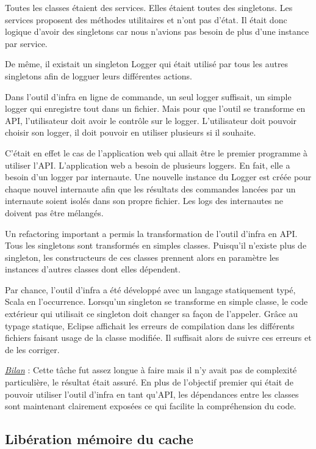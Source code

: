 Toutes les classes étaient des services. Elles étaient toutes des singletons.
Les services proposent des méthodes utilitaires et n'ont pas d'état. Il était
donc logique d'avoir des singletons car nous n'avions pas besoin de plus d'une
instance par service. 

De même, il existait un singleton Logger qui était utilisé par tous les autres
singletons afin de logguer leurs différentes actions.

Dans l'outil d'infra en ligne de commande, un seul logger suffisait, un simple
logger qui enregistre tout dans un fichier.
Mais pour que l'outil se transforme en API, l'utilisateur doit avoir le
contrôle sur le logger. L'utilisateur doit pouvoir choisir son logger, il doit
pouvoir en utiliser plusieurs si il souhaite.

C'était en effet le cas de l'application web qui allait être le premier
programme à utiliser l'API. L'application web a besoin de plusieurs
loggers. En fait, elle a besoin d'un logger par internaute.
Une nouvelle instance du Logger est créée pour chaque nouvel internaute afin
que les résultats des commandes lancées par un internaute soient isolés dans son
propre fichier. Les logs des internautes ne doivent pas être mélangés.

Un refactoring important a permis la transformation de l'outil d'infra en API.
Tous les singletons sont transformés en simples classes.
Puisqu'il n'existe plus de singleton, les constructeurs de ces classes prennent
alors en paramètre les instances d'autres classes dont elles dépendent.

Par chance, l'outil d'infra a été développé avec un langage statiquement
typé, Scala en l’occurrence.
Lorsqu'un singleton se transforme en simple classe, le code extérieur qui
utilisait ce singleton doit changer sa façon de l'appeler.
Grâce au typage statique, Eclipse affichait les erreurs de compilation dans
les différents fichiers faisant usage de la classe modifiée. Il suffisait alors
de suivre ces erreurs et de les corriger.

\underline{\textit{Bilan}} : Cette tâche fut assez longue à faire mais il n'y
avait pas de complexité particulière, le résultat était assuré.
En plus de l'objectif premier qui était de pouvoir utiliser l'outil d'infra en
tant qu'API, les dépendances entre les classes sont maintenant clairement
exposées ce qui facilite la compréhension du code.

\subsection{Libération mémoire du cache}

